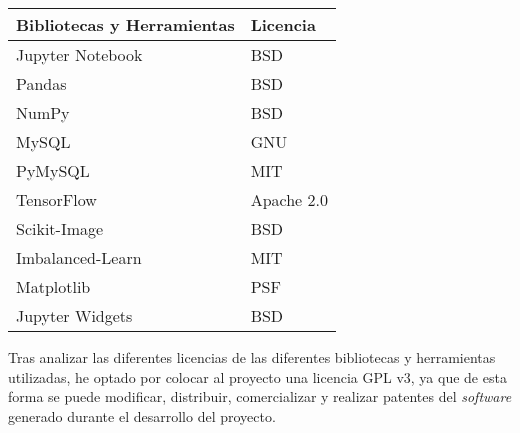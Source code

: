 \begin{center}
\begin{tabular}{|l|l|}
\hline
\textbf{Bibliotecas y Herramientas} & \textbf{Licencia} \\ \hline
Jupyter Notebook                    & BSD               \\ \hline
Pandas                              & BSD               \\ \hline
NumPy                               & BSD               \\ \hline
MySQL                               & GNU               \\ \hline
PyMySQL                             & MIT               \\ \hline
TensorFlow                          & Apache 2.0        \\ \hline
Scikit-Image                        & BSD               \\ \hline
Imbalanced-Learn                    & MIT               \\ \hline
Matplotlib                          & PSF               \\ \hline
Jupyter Widgets                     & BSD               \\ \hline
\end{tabular}
\label{t:licencias}
\end{center}

Tras analizar las diferentes licencias de las diferentes bibliotecas y herramientas utilizadas, he optado por colocar al proyecto una licencia GPL v3, ya que de esta forma se puede modificar, distribuir, comercializar y realizar patentes del \emph{software} generado durante el desarrollo del proyecto.